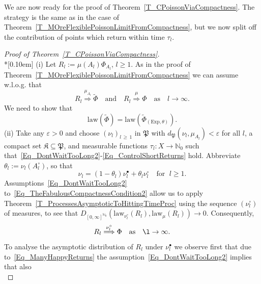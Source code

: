 \documentclass[AHL,Unicode,longabstracts]{cedram}
\newcommand{\Expl}{\mathrm{Exp}}
\newcommand{\law}{\mathrm{law}}
\newcommand{\frkK}{\mathfrak{K}}
\newcommand{\frkP}{\mathfrak{P}}
\newcommand{\bbN}{\mathbb{N}}
\begin{document}
We are now ready for the proof of Theorem~\ref{T_CPoissonViaCompactness}. The strategy is the same as in the case of Theorem~\ref{T_MOreFlexiblePoissonLimitFromCompactness}, but we now split off the contribution of points which return within time $\tau_{l}$.

\begin{proof}[Proof of Theorem~\ref{T_CPoissonViaCompactness}]\ \\*[0.10em]
\noindent (i) Let $R_{l} :=\mu(A_{l})\Phi_{A_{l}}$, $l\geq1$. As in the proof of Theorem~\ref{T_MOreFlexiblePoissonLimitFromCompactness} we can assume w.l.o.g. that
\begin{equation}\label{Eq_AGoodSubSequenceHere}
R_{l}\overset{\mu_{A_{l}}}{\Longrightarrow}\widetilde{\Phi} \quad \text{and}\quad R_{l}\overset{\mu}{\Longrightarrow}\Phi \quad\text{as}\quad l\rightarrow
\infty. 
\end{equation}
We need to show that
\begin{equation}\label{Eq_TheBigPrize}
\law\left(\widetilde{\Phi}\right)=\law\left(\widetilde{\Phi}_{(\Expl,\theta)}\right). 
\end{equation}
(ii) Take any $\varepsilon>0$ and choose $(\nu_{l})_{l\,\geq\,1}$ in $\frkP$ with $d_{\frkP}(\nu_{l},\mu_{A_{l}})<\varepsilon$ for all $l$, a compact set $\frkK\subseteq\frkP$, and measurable functions $\tau_{l}:X\rightarrow\bbN_{0}$ such that~\eqref{Eq_DontWaitTooLong2}-\eqref{Eq_ControlShortReturns} hold. Abbreviate $\theta_{l}:=\nu_{l}(A_{l}^{\circ})$, so that
\begin{equation}\label{Eq_hdhjkahfsakdfSJHFFDH}
\nu_{l}=\left(1-\theta_{l}\right)\nu_{l}^{\bullet}+\theta_{l}\nu_{l}^{\circ} \quad \text{for }\;l\geq1. 
\end{equation}
Assumptions~\eqref{Eq_DontWaitTooLong2} to~\eqref{Eq_TheFabulousCompactnessCondition2} allow us to apply Theorem~\ref{T_ProcessesAsymptoticToHittingTimeProc} using the sequence $(\nu _{l}^{\circ})$ of measures, to see that $D_{[0,\infty]^{\bbN_{0}} }(\law_{\nu_{l}^{\circ}}(R_{l}),\law_{\mu}(R_{l}))\rightarrow0$. Consequently,
\begin{equation}\label{Eq_handiballl}
R_{l}\overset{\nu_{l}^{\circ}}{\Longrightarrow}\Phi \quad\text{as}\quad\l\rightarrow\infty. 
\end{equation}
To analyse the asymptotic distribution of $R_{l}$ under $\nu_{l}^{\bullet}$ we observe first that due to~\eqref{Eq_ManyHappyReturns} the assumption~\eqref{Eq_DontWaitTooLong2} implies that also
\begin{equation}\label{Eq_hjvchgagggggg}

\end{equation}
\end{proof}
\end{document}
